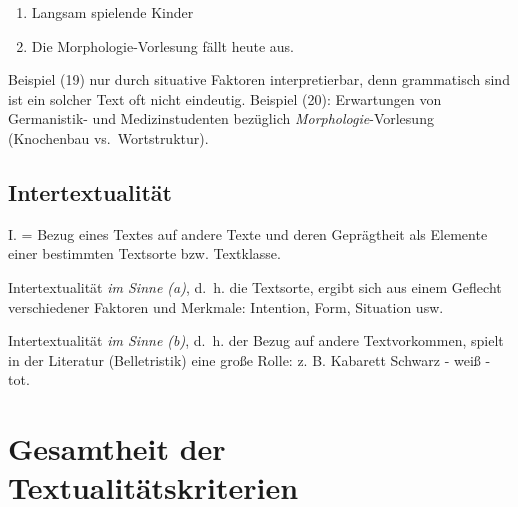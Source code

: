 \documentclass[
  letterpaper,
]{scrbook}
\providecommand{\tightlist}{%
  \setlength{\itemsep}{0pt}\setlength{\parskip}{0pt}}\usepackage{longtable,booktabs,array}
\begin{document}
\begin{enumerate}
\def\labelenumi{(\arabic{enumi})}
\setcounter{enumi}{18}
\tightlist
\item
  Langsam spielende Kinder\\
\item
  Die Morphologie-Vorlesung fällt heute aus.\\
\end{enumerate}

Beispiel (19) nur durch situative Faktoren interpretierbar, denn
grammatisch sind ist ein solcher Text oft nicht eindeutig. Beispiel
(20): Erwartungen von Germanistik- und Medizinstudenten bezüglich
\emph{Morphologie}-Vorlesung (Knochenbau vs.~Wortstruktur).

\hypertarget{intertextualituxe4t}{%
\subsection{Intertextualität}\label{intertextualituxe4t}}

I. = Bezug eines Textes auf andere Texte und deren Geprägtheit als
Elemente einer bestimmten Textsorte bzw. Textklasse.

Intertextualität \emph{im Sinne (a)}, d.~h. die Textsorte, ergibt sich
aus einem Geflecht verschiedener Faktoren und Merkmale: Intention, Form,
Situation usw.

Intertextualität \emph{im Sinne (b)}, d.~h. der Bezug auf andere
Textvorkommen, spielt in der Literatur (Belletristik) eine große Rolle:
z. B. Kabarett Schwarz - weiß - tot.

\hypertarget{gesamtheit-der-textualituxe4tskriterien}{%
\section{Gesamtheit der
Textualitätskriterien}\label{gesamtheit-der-textualituxe4tskriterien}}
\end{document}
